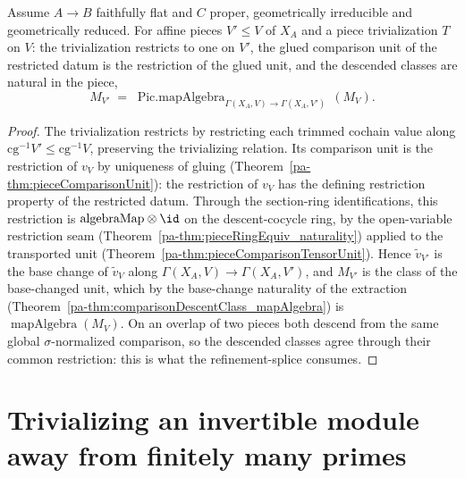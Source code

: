 \begin{theorem}
  \label{pa-thm:pieceDescentClass_res}
  \leanok

  Assume \(A \to B\) faithfully flat and \(C\) proper, geometrically irreducible and geometrically
  reduced. For affine pieces \(V' \le V\) of \(X_A\) and a piece trivialization \(T\) on \(V\): the
  trivialization restricts to one on \(V'\), the glued comparison unit of the restricted datum is the
  restriction of the glued unit, and the descended classes are natural in the piece,
  \[
    M_{V'} \;=\; \operatorname{Pic.mapAlgebra}_{\Gamma(X_A, V) \to \Gamma(X_A, V')}\,(M_V) .
  \]
\end{theorem}
\begin{proof}
  \leanok
  The trivialization restricts by restricting each trimmed cochain value along \(\mathrm{cg}^{-1}V'
  \le \mathrm{cg}^{-1}V\), preserving the trivializing relation. Its comparison unit is the
  restriction of \(v_V\) by uniqueness of gluing (Theorem~\ref{pa-thm:pieceComparisonUnit}): the
  restriction of \(v_V\) has the defining restriction property of the restricted datum. Through the
  section-ring identifications, this restriction is \(\mathrm{algebraMap} \otimes \id\) on the
  descent-cocycle ring, by the open-variable restriction seam
  (Theorem~\ref{pa-thm:pieceRingEquiv_naturality}) applied to the transported unit
  (Theorem~\ref{pa-thm:pieceComparisonTensorUnit}). Hence \(\tilde v_{V'}\) is the base change of
  \(\tilde v_V\) along \(\Gamma(X_A, V) \to \Gamma(X_A, V')\), and \(M_{V'}\) is the class of the
  base-changed unit, which by the base-change naturality of the extraction
  (Theorem~\ref{pa-thm:comparisonDescentClass_mapAlgebra}) is
  \(\operatorname{mapAlgebra}(M_V)\). On an overlap of two pieces both descend from the same global
  \(\sigma\)-normalized comparison, so the descended classes agree through their common restriction:
  this is what the refinement-splice consumes.
\end{proof}

\section{Trivializing an invertible module away from finitely many primes}
\label{pa-sec:effectivityInvertibleAvoid}

